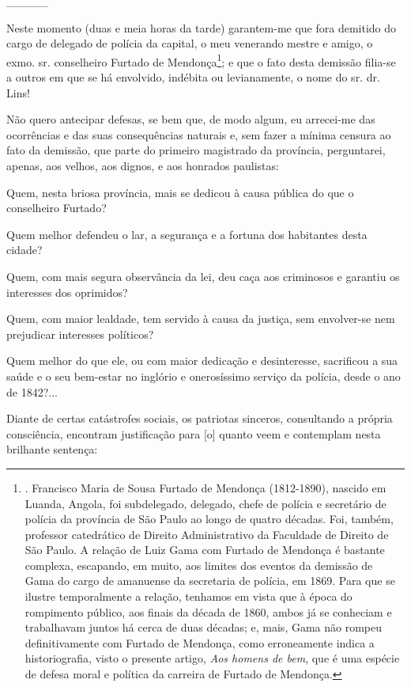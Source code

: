 \_\_\_\_\_

Neste momento (duas e meia horas da tarde) garantem-me que fora demitido
do cargo de delegado de polícia da capital, o meu venerando mestre e
amigo, o exmo. sr. conselheiro Furtado de Mendonça\footnote{. Francisco
  Maria de Sousa Furtado de Mendonça (1812-1890), nascido em Luanda,
  Angola, foi subdelegado, delegado, chefe de polícia e secretário de
  polícia da província de São Paulo ao longo de quatro décadas. Foi,
  também, professor catedrático de Direito Administrativo da Faculdade
  de Direito de São Paulo. A relação de Luiz Gama com Furtado de
  Mendonça é bastante complexa, escapando, em muito, aos limites dos
  eventos da demissão de Gama do cargo de amanuense da secretaria de
  polícia, em 1869. Para que se ilustre temporalmente a relação,
  tenhamos em vista que à época do rompimento público, aos finais da
  década de 1860, ambos já se conheciam e trabalhavam juntos há cerca de
  duas décadas; e, mais, Gama não rompeu definitivamente com Furtado de
  Mendonça, como erroneamente indica a historiografia, visto o presente
  artigo, \emph{Aos homens de bem}, que é uma espécie de defesa moral e
  política da carreira de Furtado de Mendonça.};
\protect\hypertarget{Secao_Sem_Titulo-51}{}{}e que o fato desta demissão
filia-se a outros em que se há envolvido, indébita ou levianamente, o
nome do sr. dr. Lins!

Não quero antecipar defesas, se bem que, de modo algum, eu arrecei-me
das ocorrências e das suas consequências naturais e, sem fazer a mínima
censura ao fato da demissão, que parte do primeiro magistrado da
província, perguntarei, apenas, aos velhos, aos dignos, e aos honrados
paulistas:

Quem, nesta briosa província, mais se dedicou à causa pública do que o
conselheiro Furtado?

Quem melhor defendeu o lar, a segurança e a fortuna dos habitantes desta
cidade?

Quem, com mais segura observância da lei, deu caça aos criminosos e
garantiu os interesses dos oprimidos?

Quem, com maior lealdade, tem servido à causa da justiça, sem
envolver-se nem prejudicar interesses políticos?

Quem melhor do que ele, ou com maior dedicação e desinteresse,
sacrificou a sua saúde e o seu bem-estar no inglório e onerosíssimo
serviço da polícia, desde o ano de 1842?...

Diante de certas catástrofes sociais, os patriotas sinceros, consultando
a própria consciência, encontram justificação para {[}o{]} quanto veem e
contemplam nesta brilhante sentença:

